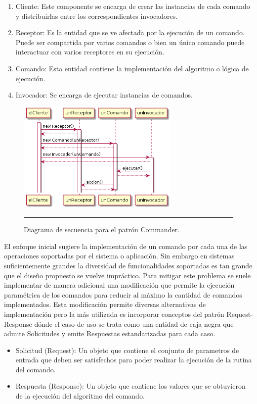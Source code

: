 \begin{enumerate}
	\item Cliente: Este componente se encarga de crear las instancias de cada comando y distribuirlas entre los correspondientes invocadores.
	\item Receptor: Es la entidad que se ve afectada por la ejecución de un comando. Puede ser compartida por varios comandos o bien un único comando puede interactuar con varios receptores en su ejecución.
	\item Comando: Esta entidad contiene la implementación del algoritmo o lógica de ejecución.
	\item Invocador: Se encarga de ejecutar instancias de comandos.
\end{enumerate}

\begin{figure}[htbp]
	\centering
	\includegraphics[width=0.7\textwidth]{Figures/uml_sequence_commander.png}
	\rule{35em}{1pt}
	\caption[MVP Components]{Diagrama de secuencia para el patrón Commander.}
	\label{fig:uml_commander_sequence}
\end{figure}

El enfoque inicial sugiere la implementación de un comando
por cada una de las operaciones soportadas por el sistema o aplicación. Sin embargo en sistemas suficientemente grandes la diversidad de funcionalidades soportadas es tan grande que el diseño propuesto se vuelve impráctico.
Para mitigar este problema se suele implementar de manera adicional una modificación que permite la ejecución paramétrica de los comandos para reducir al máximo la cantidad de comandos implementados.
Esta modificación permite diversas alternativas de implementación pero la más utilizada es incorporar conceptos del patrón Request-Response dónde el caso de uso se trata como una entidad de caja negra que admite Solicitudes y emite Respuestas estandarizadas para cada caso.
\begin{itemize}
	\item Solicitud (Request): Un objeto que contiene el conjunto de parametros de entrada que deben ser satisfechos para poder realizar la ejecución de la rutina del comando.
	\item Respuesta (Response): Un objeto que contiene los valores que se obtuvieron de la ejecución del algoritmo del comando.
\end{itemize}

